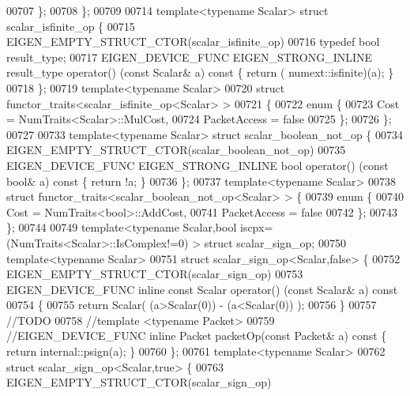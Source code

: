 \begin{DoxyCode}
00707   \};
00708 \};
00709 
00714 \textcolor{keyword}{template}<\textcolor{keyword}{typename} Scalar> \textcolor{keyword}{struct }scalar\_isfinite\_op \{
00715   EIGEN\_EMPTY\_STRUCT\_CTOR(scalar\_isfinite\_op)
00716   \textcolor{keyword}{typedef} \textcolor{keywordtype}{bool} result\_type;
00717   EIGEN\_DEVICE\_FUNC EIGEN\_STRONG\_INLINE result\_type operator() (\textcolor{keyword}{const} Scalar& a)\textcolor{keyword}{ const }\{ \textcolor{keywordflow}{return} (
      numext::isfinite)(a); \}
00718 \};
00719 \textcolor{keyword}{template}<\textcolor{keyword}{typename} Scalar>
00720 \textcolor{keyword}{struct }functor\_traits<scalar\_isfinite\_op<Scalar> >
00721 \{
00722   \textcolor{keyword}{enum} \{
00723     Cost = NumTraits<Scalar>::MulCost,
00724     PacketAccess = \textcolor{keyword}{false}
00725   \};
00726 \};
00727 
00733 \textcolor{keyword}{template}<\textcolor{keyword}{typename} Scalar> \textcolor{keyword}{struct }scalar\_boolean\_not\_op \{
00734   EIGEN\_EMPTY\_STRUCT\_CTOR(scalar\_boolean\_not\_op)
00735   EIGEN\_DEVICE\_FUNC EIGEN\_STRONG\_INLINE \textcolor{keywordtype}{bool} operator() (\textcolor{keyword}{const} \textcolor{keywordtype}{bool}& a)\textcolor{keyword}{ const }\{ \textcolor{keywordflow}{return} !a; \}
00736 \};
00737 \textcolor{keyword}{template}<\textcolor{keyword}{typename} Scalar>
00738 \textcolor{keyword}{struct }functor\_traits<scalar\_boolean\_not\_op<Scalar> > \{
00739   \textcolor{keyword}{enum} \{
00740     Cost = NumTraits<bool>::AddCost,
00741     PacketAccess = \textcolor{keyword}{false}
00742   \};
00743 \};
00744 
00749 template<typename Scalar,bool iscpx=(NumTraits<Scalar>::IsComplex!=0) > \textcolor{keyword}{struct} scalar\_sign\_op;
00750 \textcolor{keyword}{template}<\textcolor{keyword}{typename} Scalar>
00751 \textcolor{keyword}{struct }scalar\_sign\_op<Scalar,false> \{
00752   EIGEN\_EMPTY\_STRUCT\_CTOR(scalar\_sign\_op)
00753   EIGEN\_DEVICE\_FUNC \textcolor{keyword}{inline} \textcolor{keyword}{const} Scalar operator() (\textcolor{keyword}{const} Scalar& a)\textcolor{keyword}{ const}
00754 \textcolor{keyword}{  }\{
00755       \textcolor{keywordflow}{return} Scalar( (a>Scalar(0)) - (a<Scalar(0)) );
00756   \}
00757   \textcolor{comment}{//TODO}
00758   \textcolor{comment}{//template <typename Packet>}
00759   \textcolor{comment}{//EIGEN\_DEVICE\_FUNC inline Packet packetOp(const Packet& a) const \{ return internal::psign(a); \}}
00760 \};
00761 \textcolor{keyword}{template}<\textcolor{keyword}{typename} Scalar>
00762 \textcolor{keyword}{struct }scalar\_sign\_op<Scalar,true> \{
00763   EIGEN\_EMPTY\_STRUCT\_CTOR(scalar\_sign\_op)

\end{DoxyCode}
